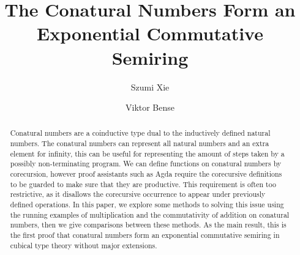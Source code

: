\documentclass[sigplan, screen, natbib=false]{acmart}
\begin{document}
\title{The Conatural Numbers Form an Exponential Commutative Semiring}

\author{Szumi Xie}

\author{Viktor Bense}


\begin{abstract}
  Conatural numbers are a coinductive type dual to the inductively defined
  natural numbers. The conatural numbers can represent all natural numbers and
  an extra element for infinity, this can be useful for representing the amount
  of steps taken by a possibly non-terminating program. We can define functions
  on conatural numbers by corecursion, however proof assistants such as Agda
  require the corecursive definitions to be guarded to make sure that they are
  productive. This requirement is often too restrictive, as it disallows the
  corecursive occurrence to appear under previously defined operations. In this
  paper, we explore some methods to solving this issue using the running
  examples of multiplication and the commutativity of addition on conatural
  numbers, then we give comparisons between these methods. As the main result,
  this is the first proof that conatural numbers form an exponential commutative
  semiring in cubical type theory without major extensions.
\end{abstract}
\end{document}

